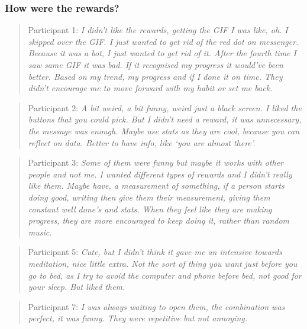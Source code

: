 \subsubsection*{How were the rewards?}
\begin{quote}
Participant 1: \textit{I didn't like the rewards, getting the GIF I was like, oh. I skipped over the GIF. I just wanted to get rid of the red dot on messenger. Because it was a bot, I just wanted to get rid of it. After the fourth time I saw same GIF it was bad. If it recognised my progress it would've been better. Based on my trend, my progress and if I done it on time. They didn't encourage me to move forward with my habit or set me back.}
\end{quote}
\begin{quote}
Participant 2: \textit{A bit weird, a bit funny, weird just a black screen. I liked the buttons that you could pick. But I didn't need a reward, it was unnecessary, the message was enough. Maybe use stats as they are cool, because you can reflect on data. Better to have info, like `you are almost there'.}
\end{quote}
\begin{quote}
Participant 3: \textit{Some of them were funny but maybe it works with other people and not me. I wanted different types of rewards and I didn't really like them. Maybe have, a measurement of something, if a person starts doing good, writing then give them their measurement, giving them constant well done's and stats. When they feel like they are making progress, they are more encouraged to keep doing it, rather than random music.}
\end{quote}
\begin{quote}
Participant 5: \textit{Cute, but I didn't think it gave me an intensive towards meditation, nice little extra. Not the sort of thing you want just before you go to bed, as I try to avoid the computer and phone before bed, not good for your sleep. But liked them.}
\end{quote}
\begin{quote}
Participant 7: \textit{I was always waiting to open them, the combination was perfect, it was funny. They were repetitive but not annoying.}
\end{quote}

